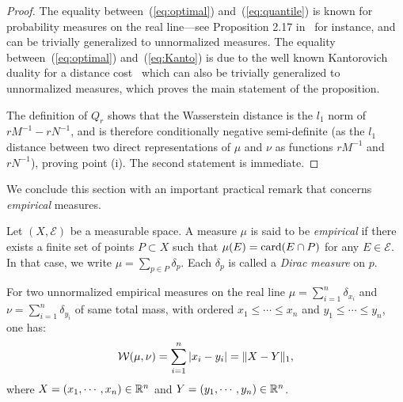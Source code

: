 \begin{proof} %
The equality between~(\ref{eq:optimal}) and~(\ref{eq:quantile}) is known for probability measures on the 
real line---see Proposition 2.17 in~\cite{Santambrogio15} for instance, and can be trivially generalized to unnormalized measures. 
The equality between~(\ref{eq:optimal}) and~(\ref{eq:Kanto}) is due to the well known Kantorovich duality for a distance 
cost~\cite[Particular case 5.4]{Villani09} which can also be trivially generalized to unnormalized measures, 
which proves the main statement of the proposition. 

The definition of $Q_r$ shows that the Wasserstein distance 
is the $l_1$ norm of $r M^{-1}- r N^{-1}$, and is therefore conditionally negative semi-definite (as the $l_1$ distance 
between two direct representations of $\mu$ and $\nu$ as functions $r M^{-1}$ and $r N^{-1}$), proving point (i). 
The second statement is immediate.
\end{proof}

We conclude this section with an important practical remark that concerns {\em empirical} measures. 

\begin{defin}
Let $(X,\mathcal E)$ be a measurable space.
A measure $\mu$ is said to be {\em empirical} if there exists a finite set of points $P\subset X$ such
that $\mu(E)={\rm card}(E\cap P)$ for any $E\in\mathcal E$. In that case, we write $\mu=\sum_{p\in P}\delta_p$.
Each $\delta_p$ is called a {\em Dirac measure} on $p$.
\end{defin}

\begin{rmq}\label{rq:empirical}
For two unnormalized empirical measures on the real line 
$\mu=\sum_{i=1}^n \delta_{x_i}$ and $\nu=\sum_{i=1}^n \delta_{y_i}$ of same total mass, with ordered 
$x_1\leq \cdots \leq x_{n}$ and $y_1\leq \cdots \leq y_{n}$, one has:
$$\mathcal W(\mu,\nu)=\sum_{i=1}^n|x_i-y_i|=\|X-Y\|_1,$$ 
where $X=(x_1,\cdots,x_n)\in\mathbb{R}^n$ and $Y=(y_1,\cdots,y_n)\in\mathbb{R}^n$.
\end{rmq}

